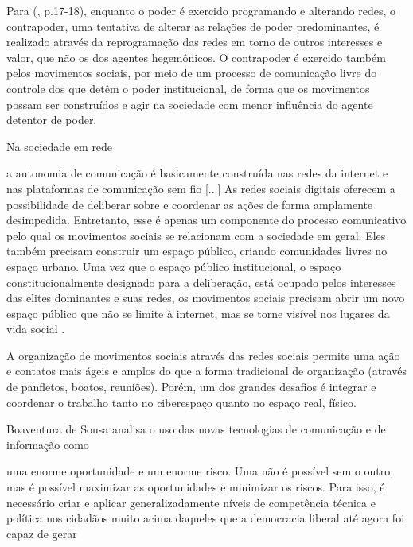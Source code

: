 Para  (\citeyear{castells2013}, p.17-18), enquanto o poder é exercido programando e alterando redes, o contrapoder, uma tentativa de alterar as relações de poder predominantes, é realizado através da reprogramação das redes em torno de outros interesses e valor, que não os dos agentes hegemônicos. O contrapoder é exercido também pelos movimentos sociais, por meio de um processo de comunicação livre do controle dos que detêm o poder institucional, de forma que os movimentos possam ser construídos e agir na sociedade com menor influência do agente detentor de poder. 

Na sociedade em rede

\begin{citacao}
a autonomia de comunicação é basicamente construída nas redes da internet e nas plataformas de comunicação sem fio [...]  As redes sociais digitais oferecem a possibilidade de deliberar sobre e coordenar as ações de forma amplamente desimpedida. Entretanto, esse é apenas um componente do processo comunicativo pelo qual os movimentos sociais se relacionam com a sociedade em geral. Eles também precisam construir um espaço público, criando comunidades livres no espaço urbano. Uma vez que o espaço público institucional, o espaço constitucionalmente designado para a deliberação, está ocupado pelos interesses das elites dominantes e suas redes, os movimentos sociais precisam abrir um novo espaço público que não se limite à internet, mas se torne visível nos lugares da vida social \cite[p .18-19]{castells2013}.
\end{citacao}

A organização de movimentos sociais através das redes sociais permite uma ação e contatos mais ágeis e amplos do que a forma tradicional de organização (através de panfletos, boatos, reuniões). Porém, um dos grandes desafios é integrar e coordenar o trabalho tanto no ciberespaço quanto no espaço real, físico.

Boaventura de Sousa  analisa o uso das novas tecnologias de comunicação e de informação como 

\begin{citacao}
uma enorme oportunidade e um enorme risco. Uma não é possível sem o outro, mas é possível maximizar as oportunidades e minimizar os riscos. Para isso, é necessário criar e aplicar generalizadamente níveis de competência técnica e política nos cidadãos muito acima daqueles que a democracia liberal até agora foi capaz de gerar \cite[p.90]{boaventura2005}
\end{citacao}


